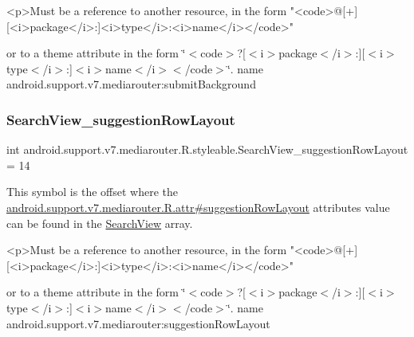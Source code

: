 \begin{DoxyVerb}      <p>Must be a reference to another resource, in the form "<code>@[+][<i>package</i>:]<i>type</i>:<i>name</i></code>"
\end{DoxyVerb}
 or to a theme attribute in the form \char`\"{}$<$code$>$?\mbox{[}$<$i$>$package$<$/i$>$\+:\mbox{]}\mbox{[}$<$i$>$type$<$/i$>$\+:\mbox{]}$<$i$>$name$<$/i$>$$<$/code$>$\char`\"{}.  name android.\+support.\+v7.\+mediarouter\+:submit\+Background \mbox{\label{classandroid_1_1support_1_1v7_1_1mediarouter_1_1R_1_1styleable_aa17d257e1bac480445b5018c0512ade5}} 
\subsubsection{\texorpdfstring{Search\+View\+\_\+suggestion\+Row\+Layout}{SearchView\_suggestionRowLayout}}
{\footnotesize\ttfamily int android.\+support.\+v7.\+mediarouter.\+R.\+styleable.\+Search\+View\+\_\+suggestion\+Row\+Layout = 14\hspace{0.3cm}{\ttfamily [static]}}

This symbol is the offset where the \hyperlink{classandroid_1_1support_1_1v7_1_1mediarouter_1_1R_1_1attr_a7753b1cfb63c3bcdc0b823c703ca27d2}{android.\+support.\+v7.\+mediarouter.\+R.\+attr\#suggestion\+Row\+Layout} attribute\textquotesingle{}s value can be found in the \hyperlink{classandroid_1_1support_1_1v7_1_1mediarouter_1_1R_1_1styleable_a5573e3195bf93122a37c69394418c7d7}{Search\+View} array.

\begin{DoxyVerb}      <p>Must be a reference to another resource, in the form "<code>@[+][<i>package</i>:]<i>type</i>:<i>name</i></code>"
\end{DoxyVerb}
 or to a theme attribute in the form \char`\"{}$<$code$>$?\mbox{[}$<$i$>$package$<$/i$>$\+:\mbox{]}\mbox{[}$<$i$>$type$<$/i$>$\+:\mbox{]}$<$i$>$name$<$/i$>$$<$/code$>$\char`\"{}.  name android.\+support.\+v7.\+mediarouter\+:suggestion\+Row\+Layout \mbox{\label{classandroid_1_1support_1_1v7_1_1mediarouter_1_1R_1_1styleable_a3d6a51de35b16974fa4a58f2beddf32d}} 
